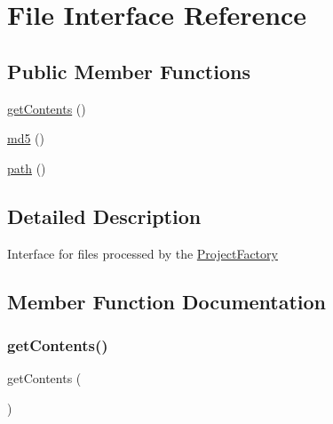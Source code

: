 \hypertarget{interfacephp_documentor_1_1_reflection_1_1_file}{}\section{File Interface Reference}
\label{interfacephp_documentor_1_1_reflection_1_1_file}
\subsection*{Public Member Functions}
\begin{DoxyCompactItemize}
\item 
\mbox{\hyperlink{interfacephp_documentor_1_1_reflection_1_1_file_a14814e04b348120748912692645f3a75}{get\+Contents}} ()
\item 
\mbox{\hyperlink{interfacephp_documentor_1_1_reflection_1_1_file_a63b637e71bf8bbee33889ae833423560}{md5}} ()
\item 
\mbox{\hyperlink{interfacephp_documentor_1_1_reflection_1_1_file_a3b05eec13add53df44e232273d718ae4}{path}} ()
\end{DoxyCompactItemize}


\subsection{Detailed Description}
Interface for files processed by the \mbox{\hyperlink{interfacephp_documentor_1_1_reflection_1_1_project_factory}{Project\+Factory}} 

\subsection{Member Function Documentation}
\mbox{\label{interfacephp_documentor_1_1_reflection_1_1_file_a14814e04b348120748912692645f3a75}} 
\subsubsection{\texorpdfstring{get\+Contents()}{getContents()}}
{\footnotesize\ttfamily get\+Contents (\begin{DoxyParamCaption}{ }\end{DoxyParamCaption})}


